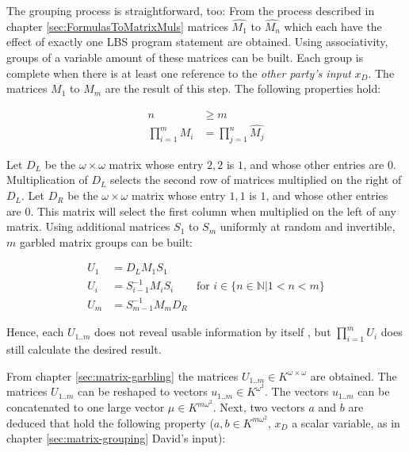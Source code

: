 \label{sec:matrix-grouping}

The grouping process is straightforward, too: From the process described in
chapter \ref{sec:FormulasToMatrixMuls} matrices $\widehat{M_1}$ to
$\widehat{M_n}$ which each have the effect of exactly one LBS program statement
are obtained.  Using associativity, groups of a variable amount of these
matrices can be built. Each group is complete when there is at least one
reference to the \emph{other party's input} $x_D$. The matrices $M_1$ to $M_m$
are the result of this step. The following properties hold:

\begin{align*}
n & \geq m \\
\prod_{i=1}^m M_i & = \prod_{j=1}^n \widehat{M_j}
\end{align*}

\label{sec:matrix-garbling}

Let $D_L$ be the $\omega \times \omega$ matrix whose entry $2,2$ is $1$, and
whose other entries are $0$. Multiplication of $D_L$ selects the second row of
matrices multiplied on the right of $D_L$. Let $D_R$ be the $\omega \times
\omega$ matrix whose entry $1,1$ is $1$, and whose other entries are $0$. This
matrix will select the first column when multiplied on the left of any matrix.
Using additional matrices $S_1$ to $S_{m}$ uniformly at random and invertible,
$m$ garbled matrix groups can be built:

\begin{align*}
U_1 & = D_L M_1 S_1 \\
U_i & = S_{i-1}^{-1} M_i S_i &
\text{for $i \in \{n \in \mathbb{N} \big| 1 < n < m\}$}\\
U_m & = S_{m-1}^{-1} M_m D_R
\end{align*}

\noindent{} Hence, each $U_{1..m}$ does not reveal usable information by itself
\cite{cramer03}, but $\prod_{i=1}^m U_i$ does still calculate the desired
result.



From chapter \ref{sec:matrix-garbling} the matrices $U_{1..m} \in K^{\omega
\times \omega}$ are obtained. The matrices $U_{1..m}$ can be reshaped to vectors
$u_{1..m} \in K^{\omega^2}$. The vectors $u_{1..m}$ can be concatenated to one
large vector $\mu \in K^{m\omega^2}$. Next, two vectors $a$ and $b$ are deduced
that hold the following property ($a, b \in K^{m\omega^2}$, $x_D$ a scalar
variable, as in chapter \ref{sec:matrix-grouping} David's input):

